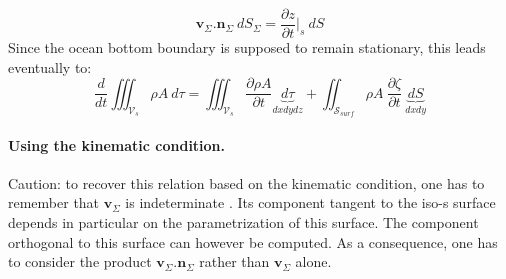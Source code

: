 \begin{equation}
 \displaystyle
  \mathbf{v}_{\Sigma}.\mathbf{n}_{\Sigma}\ dS_{\Sigma}= \frac{\partial z}{\partial t}\bigg\vert_{s}\ dS
\end{equation}
Since the ocean bottom boundary is supposed to remain stationary, this leads eventually to:
\begin{equation}
\label{eq_reyn_zeta}
  \displaystyle 
 	\frac{d }{d t} \iiint_{\mathcal{V}_{s}} \rho A\ d\tau 
   =\iiint_{\mathcal{V}_{s}} \frac{\partial \rho A}{\partial t}\underbrace{d\tau}_{dxdydz}
 +\iint_{\mathcal{S}_{surf}} \rho A\  \frac{\partial \zeta}{\partial t}\ \underbrace{dS}_{dxdy}
\end{equation}

\paragraph{Using the kinematic condition.}
Caution: to recover this relation based on the kinematic condition, one has to remember that $\mathbf{v}_{\Sigma}$ is indeterminate \citep{delhaye_thermohydraulique_2008}. Its component tangent to the iso-s surface depends in particular on the parametrization of this surface. The component orthogonal to this surface can however be computed. As a consequence, one has to consider the product $\mathbf{v}_{\Sigma}.\mathbf{n}_{\Sigma}$ rather than $\mathbf{v}_{\Sigma}$ alone. 

